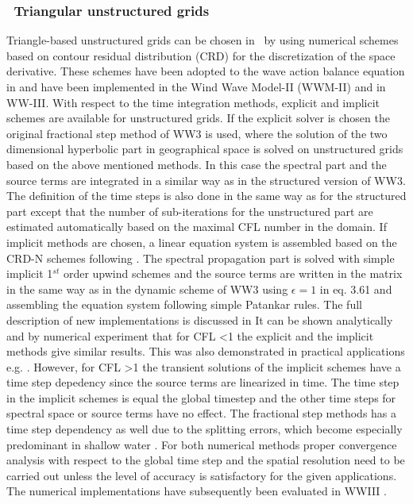 \vssub
\subsubsection{~Triangular unstructured grids} \label{sub:num_space_tri}

\noindent
Triangle-based unstructured grids can be chosen in \ws\ by using
numerical schemes based on contour residual distribution (CRD)
\citep{art:ricchiuto2005} for the discretization of the space
derivative. These schemes have been adopted to the wave action
balance equation in \citep{rep:Roland2008} and have been
implemented in the Wind Wave Model-II (WWM-II) and in WW-III.
With respect to the time integration methods, explicit
and implicit schemes are available for unstructured grids.
If the explicit solver is chosen the original fractional step
method of WW3 is used, where the solution of the two dimensional
hyperbolic part in geographical space is solved on unstructured
grids based on the above mentioned methods. In this case the
spectral part and the source terms are integrated in a similar
way as in the structured version of WW3. The definition of the time
steps is also done in the same way as for the structured part except
that the number of sub-iterations for the unstructured part are estimated
automatically based on the maximal CFL number in the domain. If implicit methods
are chosen, a linear equation system is assembled based
on the CRD-N schemes following \citep{rep:Roland2008}.
The spectral propagation part is solved with simple implicit
1$^{st}$ order upwind schemes and the source terms are written  in
the matrix in the same way as in the dynamic
scheme of WW3 using $\epsilon = 1$ in eq. 3.61 and assembling the
equation system following simple Patankar rules. The full description of new implementations is discussed in \cite{rolandetal2019t}
It can be shown analytically and by numerical experiment that
for CFL \textless 1 the explicit and the implicit methods give similar results.
This was also demonstrated in practical applications
e.g. \citep{rep:Abdolalli2018, Smith2018, rep:Abdolalli2019, AbdolaliEtAl2019OM, jmse8050308}. However, for CFL \textgreater 1
the transient solutions of the implicit schemes
have a time step depedency since the source terms are linearized
in time. The time step in the implicit schemes is equal the global timestep
and the other time steps for spectral space or source terms have no effect.
The fractional step methods has a time step
dependency as well due to the splitting errors, which become
especially predominant in shallow water \citep{rep:Roland2008}.
For both numerical methods proper convergence analysis with respect
to the global time step and the spatial resolution
need to be carried out unless the level of accuracy is
satisfactory for the given applications. The numerical implementations
have subsequently been evaluated in WWIII \citep[e.g.][]{art:Aea09,art:babanin2011,art:bertin2014,
art:bertin2015,art:dodet2013,art:ferrarin2008,art:ferrarin2013,art:janekovic2015,art:kerr2013,art:liau2011,art:Mea10,art:perrie2018,
art:perrie2013two,pro:rol2006a,pro:rol2006b,art:rol2009,art:rol2012,art:rol2014,art:sikiric2012,art:sikiric2013,art:sikiric2018,
pro:zanke2006}.


